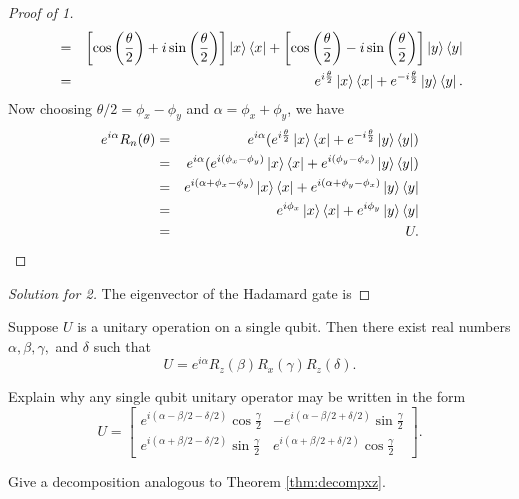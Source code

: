 \documentclass{article}
\begin{document}
\begin{exercise}
\begin{proof}[Proof of 1]
\begin{eqnarray*}
      &=& \left[\cos\left(\frac{\theta}{2}\right)
      +i\sin\left(\frac{\theta}{2}\right)\right]\ket{x}\bra{x}+\left[\cos\left(\frac{\theta}{2}\right)
      -i\sin\left(\frac{\theta}{2}\right)\right]\ket{y}\bra{y} \\
      &=&e^{i\frac{\theta}{2}}\ket{x}\bra{x}+e^{-i\frac{\theta}{2}}\ket{y}\bra{y}.
    \end{eqnarray*}
    Now choosing $\theta/2=\phi_x-\phi_y$ and $\alpha=\phi_x+\phi_y$, we have
    \begin{eqnarray*}
      e^{i\alpha}R_n(\theta)
      &=&e^{i\alpha}(e^{i\frac{\theta}{2}}\ket{x}\bra{x}+e^{-i\frac{\theta}{2}}\ket{y}\bra{y}) \\
      &=&e^{i\alpha}(e^{i(\phi_x-\phi_y)}\ket{x}\bra{x}+e^{i(\phi_y-\phi_x)}\ket{y}\bra{y}) \\
      &=& e^{i(\alpha+\phi_x-\phi_y)}\ket{x}\bra{x}+e^{i(\alpha+\phi_y-\phi_x)}\ket{y}\bra{y} \\
      &=& e^{i\phi_x}\ket{x}\bra{x}+e^{i\phi_y}\ket{y}\bra{y} \\
      &=& U.
    \end{eqnarray*}
  \end{proof}
  \begin{proof}[Solution for 2]
    The eigenvector of the Hadamard gate is
  \end{proof}
\end{exercise}

\begin{theorem}
  \label{thm:decompxz}
  Suppose $U$ is a unitary operation on a single qubit. Then there exist real numbers $\alpha,\beta,\gamma,$ and $\delta$ such that
  \[
    U=e^{i\alpha}R_z(\beta)R_x(\gamma)R_z(\delta).
  \]
\end{theorem}

\begin{exercise}
  Explain why any single qubit unitary operator may be written in the form
  \[
    U=\begin{bmatrix}
      e^{i(\alpha-\beta/2-\delta/2)}\cos\frac{\gamma}{2}&-e^{i(\alpha-\beta/2+\delta/2)}\sin\frac{\gamma}{2} \\
      e^{i(\alpha+\beta/2-\delta/2)}\sin\frac{\gamma}{2}&e^{i(\alpha+\beta/2+\delta/2)}\cos\frac{\gamma}{2}
    \end{bmatrix}.
  \]
\end{exercise}

\begin{exercise}
  Give a decomposition analogous to Theorem \ref{thm:decompxz}.
\end{exercise}
\end{document}
